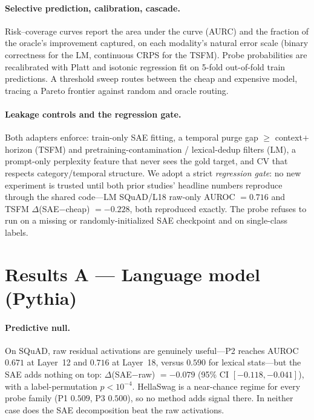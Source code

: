 \documentclass[11pt]{article}
\newcommand{\sae}{SAE}
\begin{document}
\paragraph{Selective prediction, calibration, cascade.}
Risk--coverage curves report the area under the curve (AURC) and the fraction of
the oracle's improvement captured, on each modality's natural error scale (binary
correctness for the LM, continuous CRPS for the TSFM). Probe probabilities are
recalibrated with Platt \citep{platt1999probabilistic} and isotonic regression
fit on 5-fold out-of-fold train predictions. A threshold sweep routes between the
cheap and expensive model, tracing a Pareto frontier against random and oracle
routing.

\paragraph{Leakage controls and the regression gate.}
Both adapters enforce: train-only \sae{} fitting, a temporal purge gap
$\ge$ context$+$horizon (TSFM) and pretraining-contamination / lexical-dedup
filters (LM), a prompt-only perplexity feature that never sees the gold target,
and CV that respects category/temporal structure. We adopt a strict
\emph{regression gate}: no new experiment is trusted until both prior studies'
headline numbers reproduce through the shared code---LM SQuAD/L18 raw-only
AUROC $=0.716$ and TSFM $\Delta$(\sae{}$-$cheap) $=-0.228$, both reproduced
exactly. The probe refuses to run on a missing or randomly-initialized \sae{}
checkpoint and on single-class labels.

\section{Results A --- Language model (Pythia)}
\label{sec:llm}

\paragraph{Predictive null.}
On SQuAD, raw residual activations are genuinely useful---P2 reaches AUROC $0.671$
at Layer~12 and $0.716$ at Layer~18, versus $0.590$ for lexical stats---but the
\sae{} adds nothing on top: $\Delta$(\sae{}$-$raw) $=-0.079$ (95\% CI
$[-0.118,-0.041]$), with a label-permutation $p<10^{-4}$. HellaSwag is a
near-chance regime for every probe family (P1 $0.509$, P3 $0.500$), so no method
adds signal there. In neither case does the \sae{} decomposition beat the raw
activations.
\end{document}
